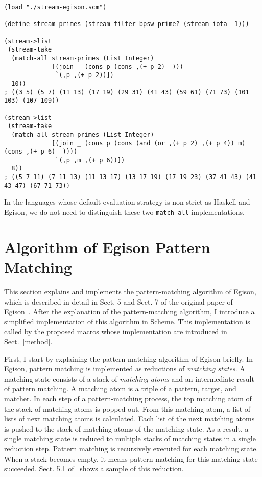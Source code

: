 \documentclass[acmlarge]{acmart}
\begin{document}
\begin{lstlisting}[language=egison]
(load "./stream-egison.scm")

(define stream-primes (stream-filter bpsw-prime? (stream-iota -1)))

(stream->list
 (stream-take
  (match-all stream-primes (List Integer)
             [(join _ (cons p (cons ,(+ p 2) _)))
              `(,p ,(+ p 2))])
  10))
; ((3 5) (5 7) (11 13) (17 19) (29 31) (41 43) (59 61) (71 73) (101 103) (107 109))

(stream->list
 (stream-take
  (match-all stream-primes (List Integer)
             [(join _ (cons p (cons (and (or ,(+ p 2) ,(+ p 4)) m) (cons ,(+ p 6) _))))
              `(,p ,m ,(+ p 6))])
  8))
; ((5 7 11) (7 11 13) (11 13 17) (13 17 19) (17 19 23) (37 41 43) (41 43 47) (67 71 73))
\end{lstlisting}

In the languages whose default evaluation strategy is non-strict as Haskell and Egison, we do not need to distinguish these two \texttt{match-all} implementations.

\section{Algorithm of Egison Pattern Matching}\label{algorithm}

This section explains and implements the pattern-matching algorithm of Egison, which is described in detail in Sect. 5 and Sect. 7 of the original paper of Egison~\cite{egi2018aplas}.
After the explanation of the pattern-matching algorithm, I introduce a simplified implementation of this algorithm in Scheme.
This implementation is called by the proposed macros whose implementation are introduced in Sect.~\ref{method}.

\medskip

First, I start by explaining the pattern-matching algorithm of Egison briefly.
In Egison, pattern matching is implemented as reductions of \emph{matching states}.
A matching state consists of a stack of \emph{matching atoms} and an intermediate result of pattern matching.
A matching atom is a triple of a pattern, target, and matcher.
In each step of a pattern-matching process, the top matching atom of the stack of matching atoms is popped out.
From this matching atom, a list of lists of next matching atoms is calculated.
Each list of the next matching atoms is pushed to the stack of matching atoms of the matching state.
As a result, a single matching state is reduced to multiple stacks of matching states in a single reduction step.
Pattern matching is recursively executed for each matching state.
When a stack becomes empty, it means pattern matching for this matching state succeeded.
Sect. 5.1 of~\cite{egi2018aplas} shows a sample of this reduction.
\end{document}
